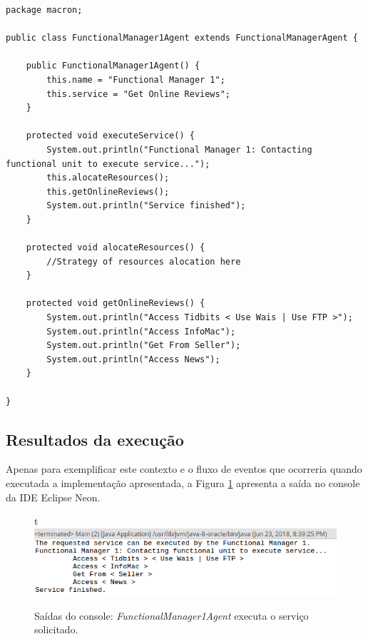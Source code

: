 \begin{lstlisting}
package macron;

public class FunctionalManager1Agent extends FunctionalManagerAgent {

	public FunctionalManager1Agent() {
		this.name = "Functional Manager 1";
		this.service = "Get Online Reviews";				
	}
	
	protected void executeService() {
		System.out.println("Functional Manager 1: Contacting functional unit to execute service...");
		this.alocateResources();
		this.getOnlineReviews();
		System.out.println("Service finished");
	}
	
	protected void alocateResources() {
		//Strategy of resources alocation here
	}

	protected void getOnlineReviews() {
		System.out.println("Access Tidbits < Use Wais | Use FTP >");
		System.out.println("Access InfoMac");
		System.out.println("Get From Seller");
		System.out.println("Access News");
	}
	
}
\end{lstlisting}



\subsection{Resultados da execução}


Apenas para exemplificar este contexto e o fluxo de eventos que ocorreria quando executada a implementação apresentada, a Figura \ref{fig:macron_console} apresenta a saída no console da IDE Eclipse Neon.

\begin{figure}{t}
\includegraphics[scale=0.7]{figuras/macron/macron_console.png}
\caption{Saídas do console: \textit{FunctionalManager1Agent} executa o serviço solicitado.}
\label{fig:macron_console}
\end{figure}